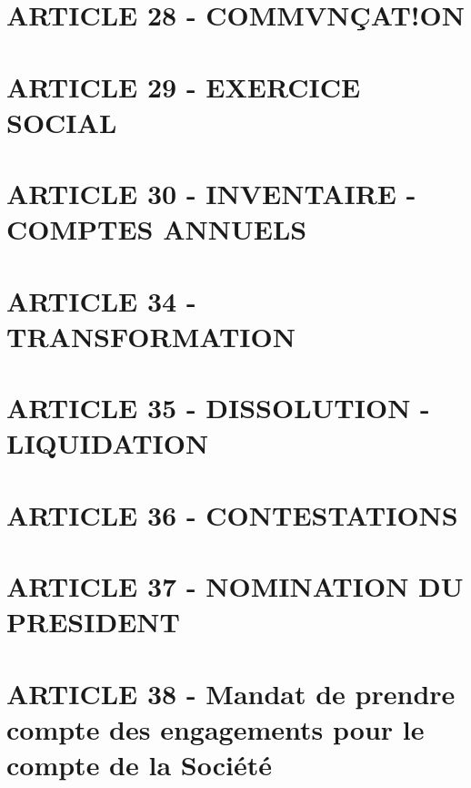 \documentclass[a4paper, 11pt]{article}
\begin{document}
\section*{ARTICLE 28 - COMMVNÇAT!ON}

\section*{ARTICLE 29 - EXERCICE SOCIAL}

\section*{ARTICLE 30 - INVENTAIRE - COMPTES ANNUELS}

\section*{ARTICLE 34 - TRANSFORMATION}

\section*{ARTICLE 35 - DISSOLUTION - LIQUIDATION}

\section*{ARTICLE 36 - CONTESTATIONS}

\section*{ARTICLE 37 - NOMINATION DU PRESIDENT}

\section*{ARTICLE 38 - Mandat de prendre compte des engagements pour le compte de la Société}
\end{document}
